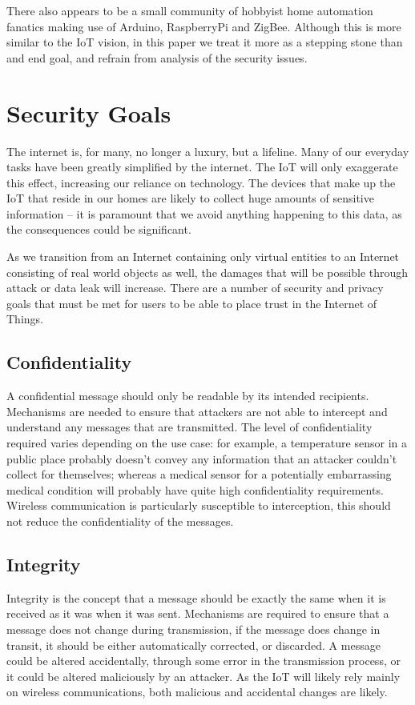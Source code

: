 \documentclass[10pt,journal,compsoc]{IEEEtran}
\begin{document}
There also appears to be a small community of hobbyist home automation fanatics
making use of Arduino, RaspberryPi and ZigBee. Although this is more similar to
the IoT vision, in this paper we treat it more as a stepping stone than and end
goal, and refrain from analysis of the security issues.

\section{Security Goals}
The internet is, for many, no longer a luxury, but a lifeline. Many of our
everyday tasks have been greatly simplified by the internet. The IoT will only
exaggerate this effect, increasing our reliance on technology. The devices that
make up the IoT that reside in our homes are likely to collect huge amounts of
sensitive information -- it is paramount that we avoid anything happening to
this data, as the consequences could be significant. 

As we transition from an Internet containing only virtual entities to an
Internet consisting of real world objects as well, the damages that will be
possible through attack or data leak will increase. There are a number of
security and privacy goals that must be met for users to be able to place trust
in the Internet of Things.

\subsection{Confidentiality}
A confidential message should only be readable by its intended recipients.
Mechanisms are needed to ensure that attackers are not able to intercept and
understand any messages that are transmitted. The level of confidentiality
required varies depending on the use case: for example, a temperature sensor in
a public place probably doesn't convey any information that an attacker
couldn't collect for themselves; whereas a medical sensor for a potentially
embarrassing medical condition will probably have quite high confidentiality
requirements. Wireless communication is particularly susceptible to
interception, this should not reduce the confidentiality of the messages.  

\subsection{Integrity}
Integrity is the concept that a message should be exactly the same when it is
received as it was when it was sent. Mechanisms are required to ensure that a
message does not change during transmission, if the message does change in
transit, it should be either automatically corrected, or discarded. A message
could be altered accidentally, through some error in the transmission process,
or it could be altered maliciously by an attacker. As the IoT will likely rely
mainly on wireless communications, both malicious and accidental changes are likely. 
\end{document}
